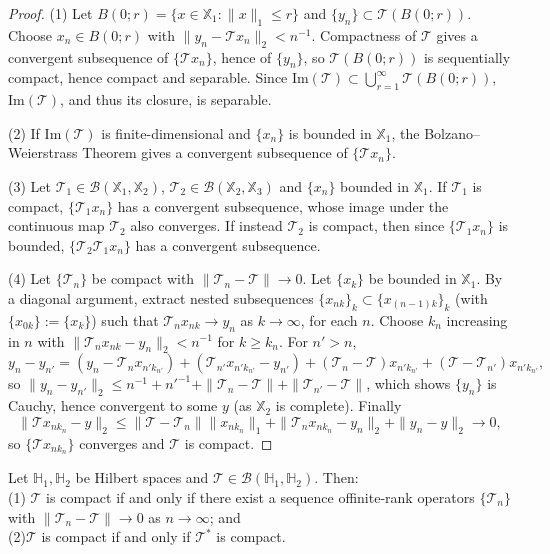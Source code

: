 \begin{proof}
(1) Let $B(0;r) = \{x\in\mathbb{X}_1:\|x\|_1\leq r\}$ and $\{y_n\}\subset
\mathcal{T}(B(0;r))$. Choose $x_n\in B(0;r)$ with $\|y_n-\mathcal{T}x_n\|_2
<n^{-1}$. Compactness of $\mathcal{T}$ gives a convergent subsequence of
$\{\mathcal{T}x_n\}$, hence of $\{y_n\}$, so $\mathcal{T}(B(0;r))$ is
sequentially compact, hence compact and separable. Since
$\mathrm{Im}(\mathcal{T})\subset\bigcup_{r=1}^\infty \mathcal{T}(B(0;r))$,
$\mathrm{Im}(\mathcal{T})$, and thus its closure, is separable.

(2) If $\mathrm{Im}(\mathcal{T})$ is finite-dimensional and $\{x_n\}$ is
bounded in $\mathbb{X}_1$, the Bolzano--Weierstrass Theorem gives a
convergent subsequence of $\{\mathcal{T}x_n\}$.

(3) Let $\mathcal{T}_1\in\mathcal{B}(\mathbb{X}_1,\mathbb{X}_2)$,
$\mathcal{T}_2\in\mathcal{B}(\mathbb{X}_2,\mathbb{X}_3)$ and $\{x_n\}$
bounded in $\mathbb{X}_1$. If $\mathcal{T}_1$ is compact, $\{\mathcal{T}_1
x_n\}$ has a convergent subsequence, whose image under the continuous map
$\mathcal{T}_2$ also converges. If instead $\mathcal{T}_2$ is compact, then
since $\{\mathcal{T}_1x_n\}$ is bounded, $\{\mathcal{T}_2\mathcal{T}_1x_n\}$
has a convergent subsequence.

(4) Let $\{\mathcal{T}_n\}$ be compact with $\|\mathcal{T}_n-\mathcal{T}\|
\to 0$. Let $\{x_k\}$ be bounded in $\mathbb{X}_1$. By a diagonal argument,
extract nested subsequences $\{x_{nk}\}_k\subset\{x_{(n-1)k}\}_k$ (with
$\{x_{0k}\}:=\{x_k\}$) such that $\mathcal{T}_nx_{nk}\to y_n$ as
$k\to\infty$, for each $n$. Choose $k_n$ increasing in $n$ with
$\|\mathcal{T}_nx_{nk}-y_n\|_2<n^{-1}$ for $k\geq k_n$. For $n'>n$,
\[
y_n-y_{n'} = (y_n-\mathcal{T}_nx_{n'k_{n'}}) +
(\mathcal{T}_{n'}x_{n'k_{n'}}-y_{n'}) +
(\mathcal{T}_n-\mathcal{T})x_{n'k_{n'}} +
(\mathcal{T}-\mathcal{T}_{n'})x_{n'k_{n'}},
\]
so $\|y_n-y_{n'}\|_2 \leq n^{-1}+n'^{-1}+\|\mathcal{T}_n-\mathcal{T}\|+
\|\mathcal{T}_{n'}-\mathcal{T}\|$, which shows $\{y_n\}$ is Cauchy, hence
convergent to some $y$ (as $\mathbb{X}_2$ is complete). Finally
\[
\|\mathcal{T}x_{nk_n}-y\|_2 \leq \|\mathcal{T}-\mathcal{T}_n\|\|x_{nk_n}\|_1
+ \|\mathcal{T}_nx_{nk_n}-y_n\|_2 + \|y_n-y\|_2 \to 0,
\]
so $\{\mathcal{T}x_{nk_n}\}$ converges and $\mathcal{T}$ is compact.
\end{proof}

\begin{theorem}
\label{thm:compact_finite_approx}
Let $\mathbb{H}_1,\mathbb{H}_2$ be Hilbert spaces and
$\mathcal{T}\in\mathcal{B}(\mathbb{H}_1,\mathbb{H}_2)$. Then:\\
(1) $\mathcal{T}$ is compact if and only if there exist a sequence offinite-rank operators $\{\mathcal{T}_n\}$
with $\|\mathcal{T}_n-\mathcal{T}\|\to 0$ as $n\to\infty$; and\\
(2)$\mathcal{T}$ is compact if and only if $\mathcal{T}^*$ is compact.
\end{theorem}

